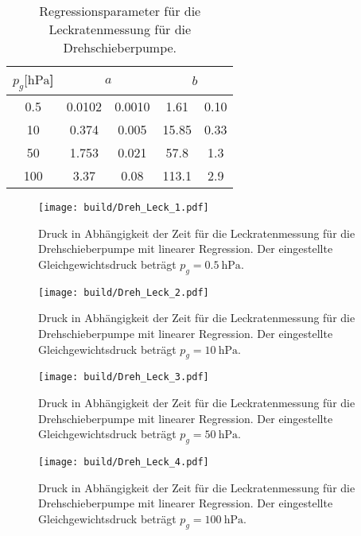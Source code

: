 \begin{table}
    \centering
      \caption{Regressionsparameter für die Leckratenmessung für die Drehschieberpumpe.}
      \label{tab:Dreh_Leck_para}
      \begin{tabular}{c c @{${}\pm{}$} c c @{${}\pm{}$} c}
        \toprule
        {$p_g [\si{\hecto\pascal}$]} & \multicolumn{2}{c}{$a$} & \multicolumn{2}{c}{$b$} \\
        \midrule
        0.5 & 0.0102 & 0.0010 & 1.61  & 0.10\\
        10  & 0.374  & 0.005  & 15.85 & 0.33\\
        50  & 1.753  & 0.021  & 57.8  & 1.3\\
        100 & 3.37   & 0.08   & 113.1 & 2.9\\
        \bottomrule
      \end{tabular}
\end{table}
\begin{figure}
    \centering
    \texttt{[image: build/Dreh\_Leck\_1.pdf]}
    \caption{Druck in Abhängigkeit der Zeit für die Leckratenmessung für die Drehschieberpumpe mit linearer Regression. Der eingestellte Gleichgewichtsdruck beträgt $p_g=\SI{0.5}{\hecto\pascal}$.}
    \label{fig:dreh_leck1}
\end{figure}

\begin{figure}
    \centering
    \texttt{[image: build/Dreh\_Leck\_2.pdf]}
    \caption{Druck in Abhängigkeit der Zeit für die Leckratenmessung für die Drehschieberpumpe mit linearer Regression. Der eingestellte Gleichgewichtsdruck beträgt $p_g=\SI{10}{\hecto\pascal}$.}
    \label{fig:dreh_leck2}
\end{figure}

\begin{figure}
    \centering
    \texttt{[image: build/Dreh\_Leck\_3.pdf]}
    \caption{Druck in Abhängigkeit der Zeit für die Leckratenmessung für die Drehschieberpumpe mit linearer Regression. Der eingestellte Gleichgewichtsdruck beträgt $p_g=\SI{50}{\hecto\pascal}$.}
    \label{fig:dreh_leck3}
\end{figure}

\begin{figure}
    \centering
    \texttt{[image: build/Dreh\_Leck\_4.pdf]}
    \caption{Druck in Abhängigkeit der Zeit für die Leckratenmessung für die Drehschieberpumpe mit linearer Regression. Der eingestellte Gleichgewichtsdruck beträgt $p_g=\SI{100}{\hecto\pascal}$.}
    \label{fig:dreh_leck4}
\end{figure}
\noindent
